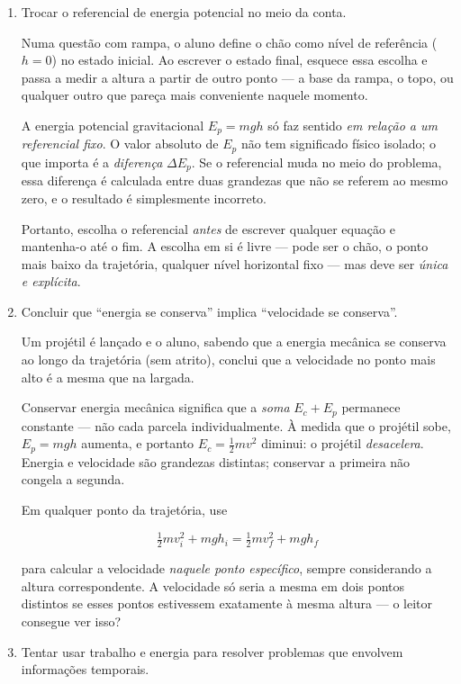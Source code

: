 \begin{enumerate}
    \item [(ii)] Trocar o referencial de energia potencial no meio da
conta.

Numa questão com rampa, o aluno define o chão como
nível de referência ($h = 0$) no estado inicial. Ao escrever o estado
final, esquece essa escolha e passa a medir a altura a partir de outro
ponto --- a base da rampa, o topo, ou qualquer outro que pareça mais
conveniente naquele momento.

A energia potencial gravitacional
$E_p = mgh$ só faz sentido \emph{em relação a um referencial fixo}.
O valor absoluto de $E_p$ não tem significado físico isolado; o que
importa é a \emph{diferença} $\Delta E_p$. Se o referencial muda no
meio do problema, essa diferença é calculada entre duas grandezas que
não se referem ao mesmo zero, e o resultado é simplesmente incorreto.

Portanto, escolha o referencial \emph{antes} de escrever
qualquer equação e mantenha-o até o fim. A escolha em si é livre ---
pode ser o chão, o ponto mais baixo da trajetória, qualquer nível
horizontal fixo --- mas deve ser \emph{única e explícita}. 

 \item [(iii)] Concluir que ``energia se conserva'' implica ``velocidade
se conserva''.

Um projétil é lançado e o aluno, sabendo que a
energia mecânica se conserva ao longo da trajetória (sem atrito),
conclui que a velocidade no ponto mais alto é a mesma que na largada.

Conservar energia mecânica significa que a
\emph{soma} $E_c + E_p$ permanece constante --- não cada parcela
individualmente. À medida que o projétil sobe, $E_p = mgh$ aumenta, e
portanto $E_c = \frac{1}{2}mv^2$ diminui: o projétil \emph{desacelera}.
Energia e velocidade são grandezas distintas; conservar a primeira não
congela a segunda.

Em qualquer ponto da trajetória, use

\[
  \tfrac{1}{2}mv_i^2 + mgh_i = \tfrac{1}{2}mv_f^2 + mgh_f
\]

\noindent para calcular a velocidade \emph{naquele ponto específico},
sempre considerando a altura correspondente. A velocidade só seria a
mesma em dois pontos distintos se esses pontos estivessem exatamente
à mesma altura --- o leitor consegue ver isso?

\item [(iv)] Tentar usar trabalho e energia para resolver problemas que envolvem informações temporais.


\end{enumerate}
